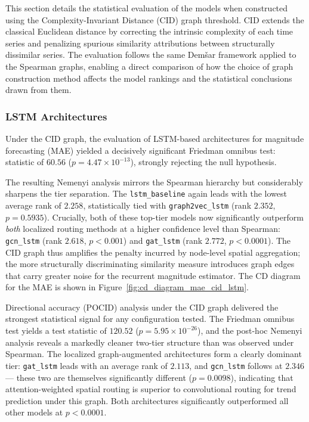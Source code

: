 This section details the statistical evaluation of the models when constructed using the Complexity-Invariant Distance (CID) graph threshold. CID extends the classical Euclidean distance by correcting the intrinsic complexity of each time series and penalizing spurious similarity attributions between structurally dissimilar series. The evaluation follows the same Dem\v{s}ar framework applied to the Spearman graphs, enabling a direct comparison of how the choice of graph construction method affects the model rankings and the statistical conclusions drawn from them.

\subsubsection{LSTM Architectures}
\label{subsubsec:cid_lstm}

Under the CID graph, the evaluation of LSTM-based architectures for magnitude forecasting (MAE) yielded a decisively significant Friedman omnibus test: statistic of $60.56$ ($p = 4.47 \times 10^{-13}$), strongly rejecting the null hypothesis.

The resulting Nemenyi analysis mirrors the Spearman hierarchy but considerably sharpens the tier separation. The \texttt{lstm\_baseline} again leads with the lowest average rank of $2.258$, statistically tied with \texttt{graph2vec\_lstm} (rank $2.352$, $p = 0.5935$). Crucially, both of these top-tier models now significantly outperform \textit{both} localized routing methods at a higher confidence level than Spearman: \texttt{gcn\_lstm} (rank $2.618$, $p < 0.001$) and \texttt{gat\_lstm} (rank $2.772$, $p < 0.0001$). The CID graph thus amplifies the penalty incurred by node-level spatial aggregation; the more structurally discriminating similarity measure introduces graph edges that carry greater noise for the recurrent magnitude estimator. The CD diagram for the MAE is shown in Figure~\ref{fig:cd_diagram_mae_cid_lstm}.


Directional accuracy (POCID) analysis under the CID graph delivered the strongest statistical signal for any configuration tested. The Friedman omnibus test yields a test statistic of $120.52$ ($p = 5.95 \times 10^{-26}$), and the post-hoc Nemenyi analysis reveals a markedly cleaner two-tier structure than was observed under Spearman. The localized graph-augmented architectures form a clearly dominant tier: \texttt{gat\_lstm} leads with an average rank of $2.113$, and \texttt{gcn\_lstm} follows at $2.346$ --- these two are themselves significantly different ($p = 0.0098$), indicating that attention-weighted spatial routing is superior to convolutional routing for trend prediction under this graph. Both architectures significantly outperformed all other models at $p < 0.0001$.

